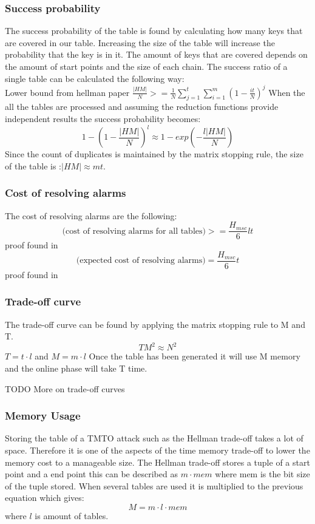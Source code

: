 \subsubsection*{Success probability}
The success probability of the table is found by calculating how many keys that are covered in our table. Increasing the size of the table will increase the probability that the key is in it. The amount of keys that are covered depends on the amount of start points and the size of each chain. The success ratio of a single table can be calculated the following way:\\
Lower bound from hellman paper\cite{176}
$\frac{|HM|}{N}>=\frac{1}{N}\sum^{t}_{j=1}\sum^{m}_{i=1}(1-\frac{it}{N})^{j} $
When the all the tables are processed and assuming the reduction functions provide independent results the success probability becomes:
\[1-(1-\frac{|HM|}{N})^l\approx 1- exp(-\frac{l|HM|}{N})\]
Since the count of duplicates is maintained by the matrix stopping rule, the size of the table is :$|HM|\approx mt$.
\subsubsection{Cost of resolving alarms}
The cost of resolving alarms are the following:
\begin{equation}
\text{(cost of resolving alarms for all tables)}>=\frac{H_{msc}}{6}lt
\end{equation}
proof found in \cite{176}
\begin{equation}
\text{(expected cost of resolving alarms)}=\frac{H_{msc}}{6}t
\end{equation}
proof found in \cite{176}
\subsubsection{Trade-off curve}
The trade-off curve can be found by applying the matrix stopping rule to M and T.
\begin{equation}
TM^2\approx N^2
\end{equation}
$T=t \cdot l$ and $M=m\cdot l$
Once the table has been generated it will use M memory and the online phase will take T time.

TODO More on trade-off curves

\subsubsection{Memory Usage}
Storing the table of a TMTO attack such as the Hellman trade-off takes a lot of space. Therefore it is one of the aspects of the time memory trade-off to lower the memory cost to a manageable size. The Hellman trade-off stores a tuple of a start point and a end point this can be described as $m\cdot mem$ where mem is the bit size of the  tuple stored. When several tables are used it is multiplied to the previous equation which gives:
\begin{equation}
M=m\cdot l \cdot mem
\end{equation}
where $l$ is amount of tables.
